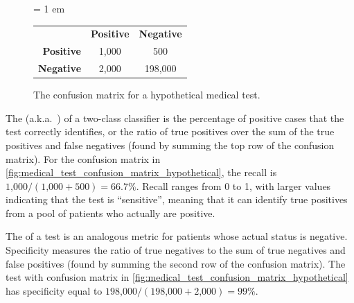 \begin{figure}[h]
\centering
\tabcolsep = 1 em
\mySfFamily
{}
\begin{tabular}{r c c}
\rowcolor{gray!50}
& \textbf{Positive} & \textbf{Negative} \\
 \textbf{Positive} & 1,000 & \phantom{198,}500 \\
\textbf{Negative} & 2,000 & 198,000 \\
\end{tabular}
\caption{The confusion matrix for a hypothetical medical test.}
\label{fig:medical_test_confusion_matrix_hypothetical}
\end{figure}


The  (a.k.a.~) of a two-class classifier is the percentage of positive cases that the test correctly identifies, or the ratio of true positives over the sum of the true positives and false negatives (found by summing the top row of the confusion matrix). For the confusion matrix in \autoref{fig:medical_test_confusion_matrix_hypothetical}, the recall is $\text{1,000}/(\text{1,000} + 500) = 66.7\%$. Recall ranges from 0 to 1, with larger values indicating that the test is ``sensitive'', meaning that it can identify true positives from a pool of patients who actually are positive.

The  of a test is an analogous metric for patients whose actual status is negative. Specificity measures the ratio of true negatives to the sum of true negatives and false positives (found by summing the second row of the confusion matrix). The test with confusion matrix in \autoref{fig:medical_test_confusion_matrix_hypothetical} has specificity equal to $\text{198,000}/(\text{198,000} + \text{2,000}) = 99\%$.


